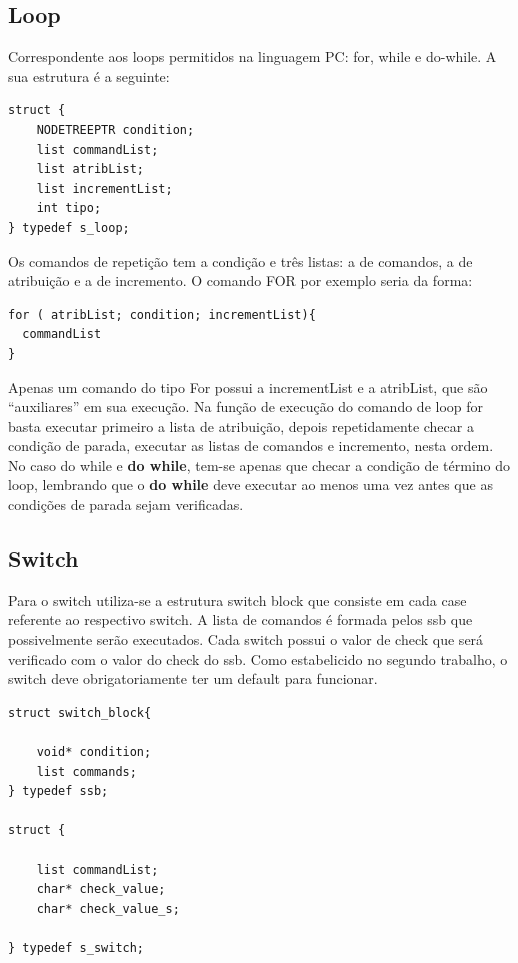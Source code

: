 \documentclass[a4paper,10pt]{article}
\begin{document}
\subsection{Loop}

Correspondente aos loops permitidos na linguagem PC: for, while e do-while. A sua estrutura é a seguinte:

\begin{lstlisting}
struct {
	NODETREEPTR condition;
	list commandList;
	list atribList;
	list incrementList;
	int tipo;
} typedef s_loop;
\end{lstlisting}

Os comandos de repetição tem a condição e três listas: a de comandos, a de atribuição e a de incremento. O comando FOR por exemplo seria da forma:

\begin{lstlisting}
for ( atribList; condition; incrementList){
  commandList
}
\end{lstlisting}
Apenas um comando do tipo For possui a incrementList e a atribList, que são ``auxiliares'' em sua execução.
Na função de execução do comando de loop for basta executar primeiro a lista de atribuição, depois repetidamente checar a condição de parada, executar as listas de comandos e incremento, nesta ordem. 
No caso do while e \textbf{do while}, tem-se apenas que checar a condição de término do loop, lembrando que o \textbf{do while} deve executar ao menos
uma vez antes que as condições de parada sejam verificadas.

\subsection{Switch}

Para o switch utiliza-se a estrutura switch block que consiste em cada case referente ao respectivo switch. A lista de comandos é formada pelos ssb que possivelmente serão executados.
Cada switch possui o valor de check que será verificado com o valor do check do ssb. Como estabelicido no segundo trabalho, o switch deve obrigatoriamente ter um default para funcionar.

\begin{lstlisting}
struct switch_block{

    void* condition;
    list commands;
} typedef ssb;

struct {

	list commandList;
	char* check_value;
    char* check_value_s;

} typedef s_switch;
\end{lstlisting}
\end{document}
